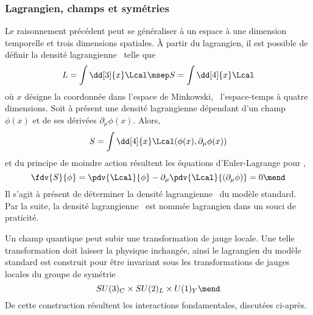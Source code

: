 \subsubsection{Lagrangien, champs et symétries}\label{chapter-MS-MSSM-section-formalisme-subsec-into_lagrangien-subsubsec-lagrangien_champs_symetries}
Le raisonnement précédent peut se généraliser à un espace à une dimension temporelle et trois dimensions spatiales.
À partir du lagrangien, il est possible de définir la densité lagrangienne \Lcal\ telle que
\begin{equation}
L = \int\dd[3]{x}\Lcal
\msep
S = \int\dd[4]{x}\Lcal
\end{equation}
où $x$ désigne la coordonnée dans l'espace de Minkowski, \ie\ l'espace-temps à quatre dimensions.
Soit à présent une densité lagrangienne dépendant d'un champ $\phi(x)$ et de ses dérivées $\partial_\mu\phi(x)$.
Alors,
\begin{equation}
S = \int\dd[4]{x}\Lcal(\phi(x),\partial_\mu\phi(x))
\end{equation}
et du principe de moindre action résultent les équations d'Euler-Lagrange pour \Lcal,
\begin{equation}
\fdv{S}{\phi}
=
\pdv{\Lcal}{\phi} - \partial_\mu\pdv{\Lcal}{(\partial_\mu\phi)} = 0
\mend
\end{equation}
Il s'agit à présent de déterminer la densité lagrangienne \Lcal\ du modèle standard.
Par la suite, la densité lagrangienne \Lcal\ est nommée \og lagrangien \fg{} dans un souci de praticité.
\par Un champ quantique peut subir une transformation de jauge locale. Une telle transformation doit laisser la physique inchangée, ainsi le lagrangien du modèle standard est construit pour être invariant sous les transformations de jauges locales du groupe de symétrie
\begin{equation}
SU(3)_C \times SU(2)_L \times U(1)_Y
\mend
\label{eq-symmetries_lagrangien_SM}
\end{equation}
De cette construction résultent les interactions fondamentales, discutées ci-après.





